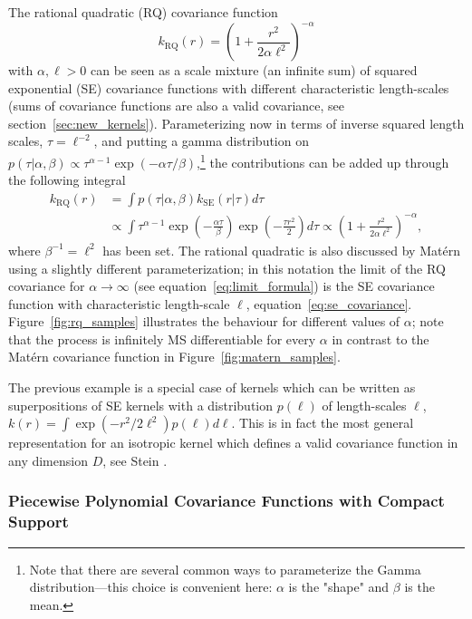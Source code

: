 \documentclass[11pt]{book}
\begin{document}
The rational quadratic (RQ) covariance function
\begin{equation}
\label{eq:rq_basic}
k_{\text{RQ}}(r) = \left(1 + \frac{r^2}{2\alpha\ell^2}\right)^{-\alpha}
\end{equation}
with $\alpha, \ell > 0$ can be seen as a scale mixture (an infinite sum) of squared exponential (SE) covariance functions with different characteristic length-scales (sums of covariance functions are also a valid covariance, see section~\ref{sec:new_kernels}). Parameterizing now in terms of inverse squared length scales, $\tau = \ell^{-2}$, and putting a gamma distribution on $p(\tau|\alpha, \beta) \propto \tau^{\alpha-1} \exp(-\alpha\tau/\beta)$,\footnote{Note that there are several common ways to parameterize the Gamma distribution—this choice is convenient here: $\alpha$ is the "shape" and $\beta$ is the mean.} the contributions can be added up through the following integral
\begin{align}
\label{eq:rq_derivation}
k_{\text{RQ}}(r) &= \int p(\tau|\alpha, \beta) k_{\text{SE}}(r|\tau) d\tau \\
&\propto \int \tau^{\alpha-1} \exp\left(-\frac{\alpha\tau}{\beta}\right) \exp\left(-\frac{\tau r^2}{2}\right) d\tau \propto \left(1 + \frac{r^2}{2\alpha\ell^2}\right)^{-\alpha}, \nonumber
\end{align}
where $\beta^{-1} = \ell^2$ has been set. The rational quadratic is also discussed by Matérn \cite{matern1960} using a slightly different parameterization; in this notation the limit of the RQ covariance for $\alpha \to \infty$ (see equation~\eqref{eq:limit_formula}) is the SE covariance function with characteristic length-scale $\ell$, equation~\eqref{eq:se_covariance}. Figure~\ref{fig:rq_samples} illustrates the behaviour for different values of $\alpha$; note that the process is infinitely MS differentiable for every $\alpha$ in contrast to the Matérn covariance function in Figure~\ref{fig:matern_samples}.

The previous example is a special case of kernels which can be written as superpositions of SE kernels with a distribution $p(\ell)$ of length-scales $\ell$, $k(r) = \int \exp(-r^2/2\ell^2) p(\ell) d\ell$. This is in fact the most general representation for an isotropic kernel which defines a valid covariance function in any dimension $D$, see Stein \cite{stein1999}.

\subsubsection{Piecewise Polynomial Covariance Functions with Compact Support}
\end{document}
